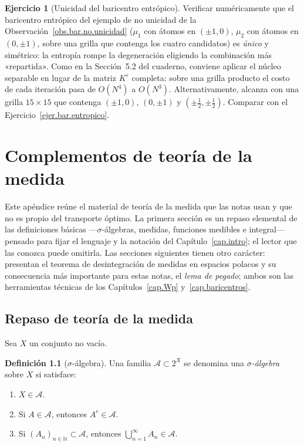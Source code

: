 \documentclass[12pt, a4paper]{amsbook}
\newcommand{\ve}{\varepsilon}
\theoremstyle{remark}
\theoremstyle{definition}
\newtheorem{defi}[teo]{Definición}
\newtheorem{ejercicio}{Ejercicio}[chapter]
\numberwithin{section}{chapter}
\numberwithin{subsection}{section}
\numberwithin{equation}{section}
\numberwithin{figure}{chapter}
\begin{document}
\begin{ejercicio}[Unicidad del baricentro entrópico]\label{ejc.eps.unicidad}
Verificar numéricamente que el baricentro entrópico del ejemplo de no
unicidad de la Observación~\ref{obs.bar.no.unicidad} ($\mu_1$ con átomos en $(\pm1,0)$,
$\mu_2$ con átomos en $(0,\pm1)$, sobre una grilla que contenga los cuatro
candidatos) es \emph{único} y simétrico: la entropía rompe la degeneración
eligiendo la combinación más «repartida». Como en la Sección~5.2 del
cuaderno, conviene aplicar el núcleo separable en lugar de la matriz
$K^\ve$ completa: sobre una grilla producto el costo de cada iteración pasa
de $O(N^4)$ a $O(N^3)$. Alternativamente, alcanza con una grilla $15\times15$
que contenga $(\pm1,0)$, $(0,\pm1)$ y $(\pm\tfrac12,\pm\tfrac12)$. Comparar
con el Ejercicio~\ref{ejer.bar.entropico}.
\end{ejercicio}

\appendix

\chapter{Complementos de teoría de la medida}\label{ap.medida}\label{ap.desintegracion}

Este apéndice reúne el material de teoría de la medida que las notas usan y
que no es propio del transporte óptimo. La primera sección es un repaso
elemental de las definiciones básicas ---$\sigma$-álgebras, medidas, funciones
medibles e integral--- pensado para fijar el lenguaje y la notación del
Capítulo~\ref{cap.intro}; el lector que las conozca puede omitirla. Las
secciones siguientes tienen otro carácter: presentan el teorema de
desintegración de medidas en espacios polacos y su consecuencia más importante
para estas notas, el \emph{lema de pegado}; ambos son las herramientas
técnicas de los Capítulos~\ref{cap.Wp} y~\ref{cap.baricentros}.

\section{Repaso de teoría de la medida}\label{sec.ap.medida.repaso}

Sea \(X\) un conjunto no vacío.

\begin{defi}[$\sigma$-álgebra]
Una familia \(\mathcal A\subset 2^X\) se denomina una \emph{\(\sigma\)-álgebra} sobre \(X\) si satisface:
\begin{enumerate}
    \item \(X\in\mathcal A\).
    \item Si \(A\in\mathcal A\), entonces \(A^c\in\mathcal A\).
    \item Si \((A_n)_{n\in\mathbb N}\subset\mathcal A\), entonces
    \(
    \bigcup_{n=1}^\infty A_n\in\mathcal A.
    \)
\end{enumerate}
\end{defi}
\end{document}
